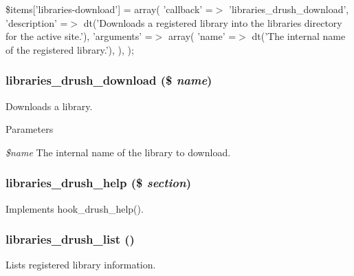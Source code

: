 \$items\mbox{[}'libraries-\/download'\mbox{]} = array( 'callback' =$>$ 'libraries\_\-drush\_\-download', 'description' =$>$ dt('Downloads a registered library into the libraries directory for the active site.'), 'arguments' =$>$ array( 'name' =$>$ dt('The internal name of the registered library.'), ), ); \hypertarget{libraries_8drush_8inc_a15eb54948d1b021d5f37606fcf2a652f}{
\subsubsection[{libraries\_\-drush\_\-download}]{\setlength{\rightskip}{0pt plus 5cm}libraries\_\-drush\_\-download (\$ {\em name})}}
\label{libraries_8drush_8inc_a15eb54948d1b021d5f37606fcf2a652f}
Downloads a library.


\begin{DoxyParams}{Parameters}
\item[{\em \$name}]The internal name of the library to download. \end{DoxyParams}
\hypertarget{libraries_8drush_8inc_a9ea33361912d7b7fd0fe5d8ce3227113}{
\subsubsection[{libraries\_\-drush\_\-help}]{\setlength{\rightskip}{0pt plus 5cm}libraries\_\-drush\_\-help (\$ {\em section})}}
\label{libraries_8drush_8inc_a9ea33361912d7b7fd0fe5d8ce3227113}
Implements hook\_\-drush\_\-help(). \hypertarget{libraries_8drush_8inc_a32abc20b9b86103a805e3a4c9246b066}{
\subsubsection[{libraries\_\-drush\_\-list}]{\setlength{\rightskip}{0pt plus 5cm}libraries\_\-drush\_\-list ()}}
\label{libraries_8drush_8inc_a32abc20b9b86103a805e3a4c9246b066}
Lists registered library information. 